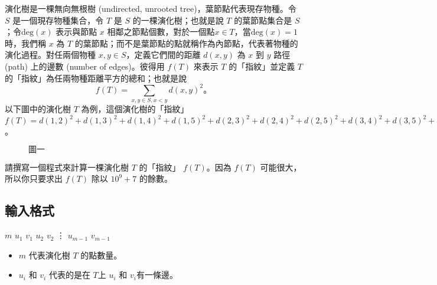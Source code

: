 演化樹是一棵無向無根樹 (undirected, unrooted
tree)，葉節點代表現存物種。令 \(S\) 是一個現存物種集合，令 \(T\) 是
\(S\) 的一棵演化樹；也就是說 \(T\) 的葉節點集合是
\(S\)；令\(\text{deg}(x)\) 表示與節點 \(x\)
相鄰之節點個數，對於一個點\(x \in T\)，當\(\text{deg}(x) = 1\)時，我們稱
\(x\) 為 \(T\)
的葉節點；而不是葉節點的點就稱作為內節點，代表著物種的演化過程。對任兩個物種
\(x, y\in S\)，定義它們間的距離 \(d(x, y)\) 為 \(x\) 到 \(y\) 路徑
(path) 上的邊數 (number of edges)。彼得用 \(f(T)\) 來表示 \(T\)
的「指紋」並定義 \(T\) 的「指紋」為任兩物種距離平方的總和；也就是說 \[
f(T) =  \sum_{x, y \in S, x < y} d(x, y)^2。
\] 以下圖中的演化樹 \(T\) 為例，這個演化樹的「指紋」
\(f(T) = d(1, 2)^2 + d(1, 3)^2 + d(1, 4)^2 + d(1, 5)^2 + d(2, 3)^2 + d(2, 4)^2 + d(2, 5)^2 + d(3, 4)^2 + d(3, 5)^2 + d(4, 5)^2 = 3^2 + 3^2 + 3^2 + 3^2 + 4^2 + 4^2 + 2^2 + 2^2 + 4^2 + 4^2 = 108\)。

\begin{figure}[H]
    \centering
    \caption{$圖一$}
\end{figure}

請撰寫一個程式來計算一棵演化樹 \(T\) 的「指紋」 \(f(T)\)。因為 \(f(T)\)
可能很大，所以你只要求出 \(f(T)\) 除以 \(10^9 + 7\) 的餘數。

\subsection{輸入格式}

\begin{format}
\f{
$m$
$u_1$ $v_1$
$u_2$ $v_2$
\vdots
$u_{m-1}$ $v_{m-1}$
}
\end{format}

\begin{itemize}
\tightlist
\item
  \(m\) 代表演化樹 \(T\) 的點數量。
\item
  \(u_i\) 和 \(v_i\) 代表的是在 \(T\)上 \(u_i\) 和 \(v_i\)有一條邊。
\end{itemize}

